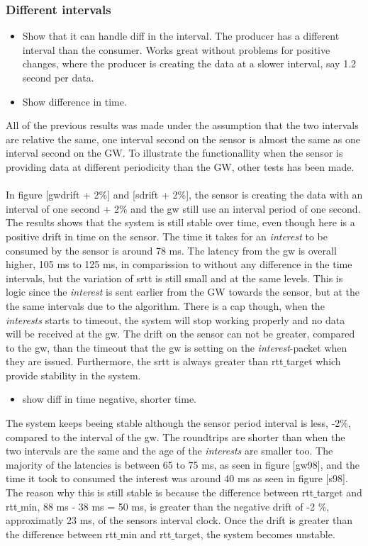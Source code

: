 \subsubsection{Different intervals}
\begin{itemize}
\item Show that it can handle diff in the interval. The producer has a different interval than the consumer. Works great without problems for positive changes, where the producer is creating the data at a slower interval, say 1.2 second per data.
\item Show difference in time. 
\end{itemize}
All of the previous results was made under the assumption that the two intervals are relative the same, one interval second on the sensor is almost the same as one interval second on the GW. To illustrate the functionallity when the sensor is providing data at different periodicity than the GW, other tests has been made.\\\\
In figure [gwdrift + 2$\%$] and [sdrift + 2$\%$], the sensor is creating the data with an interval of one second + 2$\%$ and the gw still use an interval period of one second. 
The results shows that the system is still stable over time, even though here is a positive drift in time on the sensor. The time it takes for an \textit{interest} to be consumed by the sensor is around 78 ms. The latency from the gw is overall higher, 105 ms to 125 ms, in comparission to without any difference in the time intervals, but the variation of srtt is still small and at the same levels. This is logic since the \textit{interest} is sent earlier from the GW towards the sensor, but at the the same intervals due to the algorithm. There is a cap though, when the \textit{interests} starts to timeout, the system will stop working properly and no data will be received at the gw. The drift on the sensor can not be greater, compared to the gw, than the timeout that the gw is setting on the \textit{interest}-packet when they are issued. Furthermore, the srtt is always greater than rtt$\_$target which provide stability in the system.
\begin{itemize}
	\item show diff in time negative, shorter time.
\end{itemize}
The system keeps beeing stable although the sensor period interval is less, -2$\%$, compared to the interval of the gw. The roundtrips are shorter than when the two intervals are the same and the age of the \textit{interests} are smaller too. The majority of the latencies is between 65 to 75 ms, as seen in figure [gw98], and the time it took to consumed the interest was around 40 ms as seen in figure [s98]. The reason why this is still stable is because the difference between rtt$\_$target and rtt$\_$min, 88 ms - 38 ms = 50 ms, is greater than the negative drift of -2 $\%$, approximatly 23 ms, of the sensors interval clock. Once the drift is greater than the difference between rtt$\_$min and rtt$\_$target, the system becomes unstable.






